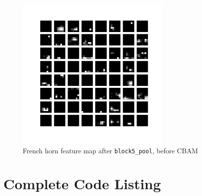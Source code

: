 \documentclass{article}
\begin{document}
\begin{appendices}
\begin{figure}[H]
    \centering
    \includegraphics[width=3in]{csci-8920/hw-4/images/horn-post-CBAM-18-block5_pool.png}
    \caption{French horn feature map after \lstinline{block5_pool}, before CBAM}
    \label{fig:horn_5_post}
\end{figure}
\section{Complete Code Listing} \label{codelist}
% 

\end{appendices}
\end{document}
